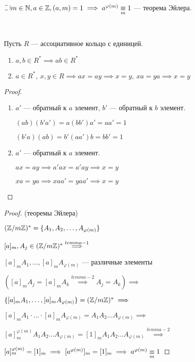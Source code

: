 \begin{theorem}
    $\letus m \in \N, a \in \Z, (a, m) = 1 \implies a^{\varphi(m)} \equivm{m} 1$ --- теорема Эйлера.
\end{theorem}

\begin{lemma}~

    Пусть $R$ --- ассоциативное кольцо с единицей.
    \begin{enumerate}
        \item $a, b \in R^* \implies ab \in R^*$
        
        \item $a \in R^*,~x,y \in R \implies ax = ay \implies x = y,~xa = ya \implies x = y$
    \end{enumerate}
\end{lemma}

\begin{proof}
    \begin{enumerate}
        \item $a'$ --- обратный к $a$ элемент, $b'$ --- обратный к $b$ элемент.
        
        $(ab)(b'a') = a(bb')a' = aa' = 1$
        
        $(b'a)(ab) = b'(aa')b = bb' = 1$
        
        \item $a'$ --- обратный к $a$ элемент.
        
        $ax = ay \implies a'ax = a'ay \implies x = y$
        
        $xa = ya \implies xaa' = yaa' \implies x = y$
    \end{enumerate}
\end{proof}

\begin{proof}(теоремы Эйлера)

    $(\mathbb{Z}/m\mathbb{Z})^* = \{A_1, A_2, \ldots, A_{\varphi(m)}\}$
    
    $[a]_m, A_j \in (\mathbb{Z}/m\mathbb{Z})^* \overset{lemma-1}{\implies}$
    
    $[a]_m A_1, \ldots, [a]_m A_{\varphi(m)}$ --- различные элементы 
    
    $([a]_m A_j = [a]_m A_k \overset{lemma-2}{\implies} A_j = A_k) \implies$
    
    $\{[a]_m A_1, \ldots, [a]_m A_{\varphi(m)}\} = (\mathbb{Z}/m\mathbb{Z})^* \implies$
    
    $[a]_m A_1 \cdot \ldots \cdot [a]_m A_{\varphi(m)} = A_1 A_2 \ldots A_{\varphi(m)} \implies$
    
    $[a]_m^{\varphi(m)} A_1 A_2 \ldots A_{\varphi(m)} = [1]_m A_1 A_2 \ldots A_{\varphi(m)} \overset{lemma-2}{\implies}$
    
    $[a]_m^{\varphi(m)} = [1]_m \implies [a^{\varphi(m)}]_m = [1]_m \implies a^{\varphi(m)} \underset{m}{\equiv} 1$
\end{proof}

